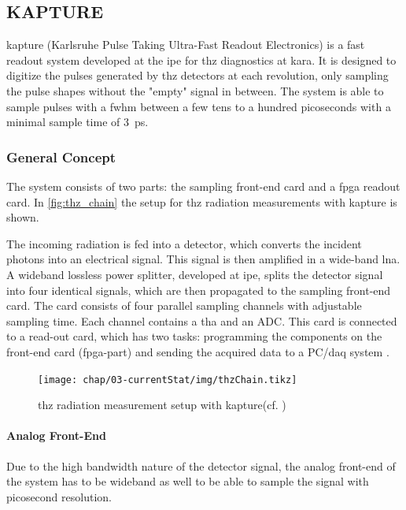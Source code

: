 \subsection{KAPTURE}
\Gls{kapture} (Karlsruhe Pulse Taking Ultra-Fast Readout Electronics) is a fast readout system developed at the \Gls{ipe} for \Gls{thz} diagnostics at \gls{kara}. It is designed to digitize the pulses generated by \Gls{thz} detectors at each revolution, only sampling the pulse shapes without the "empty" signal in between. The system is able to sample pulses with a \gls{fwhm} between a few tens to a hundred picoseconds with a minimal sample time of \SI{3}{\pico \second}. \cite{caselleKAP}

\subsubsection*{General Concept}
The system consists of two parts: the sampling front-end card and a \gls{fpga} readout card. In \autoref{fig:thz_chain} the setup for \gls{thz} radiation measurements with \gls{kapture} is shown. 

The incoming radiation is fed into a detector, which converts the incident photons into an electrical signal. 
This signal is then amplified in a wide-band \gls{lna}. 
A wideband lossless power splitter, developed at \gls{ipe}, splits the detector signal into four identical signals, which are then propagated to the sampling front-end card. 
The card consists of four parallel sampling channels with adjustable sampling time. 
Each channel contains a \gls{tha} and an ADC. 
This card is connected to a read-out card, which has two tasks: programming the components on the front-end card (\gls{fpga}-part) and sending the acquired data to a PC/\gls{daq} system \cite{caselle2014}.

\begin{figure}[tbh]
	\centering
	\texttt{[image: chap/03-currentStat/img/thzChain.tikz]}
	\caption[THz measurement with KAPTURE]{\gls{thz} radiation measurement setup with \gls{kapture}(cf. \cite{caselle2014})}
	\label{fig:thz_chain}
\end{figure}

\paragraph{Analog Front-End}
Due to the high bandwidth nature of the detector signal, the analog front-end of the system has to be wideband as well to be able to sample the signal with picosecond resolution. 


